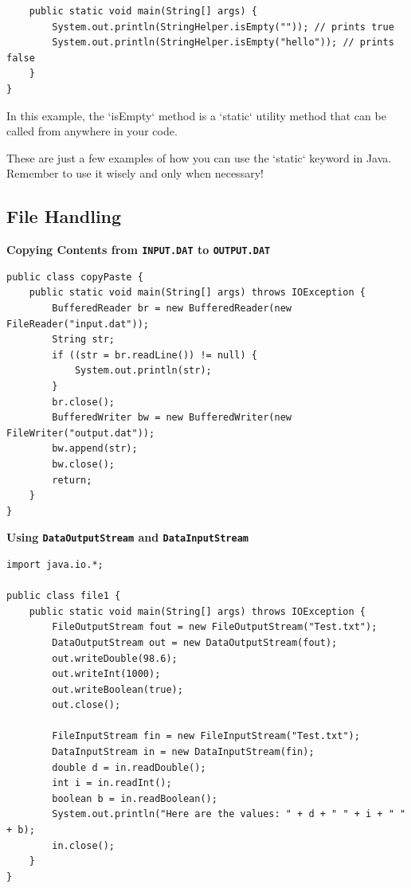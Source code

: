 \documentclass{book}
\begin{document}
\begin{enumerate}
\begin{verbatim}
    public static void main(String[] args) {
        System.out.println(StringHelper.isEmpty("")); // prints true
        System.out.println(StringHelper.isEmpty("hello")); // prints false
    }
}          
        \end{verbatim}
	      In this example, the `isEmpty` method is a `static` utility method that can be called from anywhere in your code.

	      These are just a few examples of how you can use the `static` keyword in Java. Remember to use it wisely and only when necessary!
\end{enumerate}
\subsection{File Handling}

\textbf{Copying Contents from \texttt{INPUT.DAT} to \texttt{OUTPUT.DAT}}

\begin{verbatim}
public class copyPaste {
    public static void main(String[] args) throws IOException {
        BufferedReader br = new BufferedReader(new FileReader("input.dat"));
        String str;
        if ((str = br.readLine()) != null) {
            System.out.println(str);
        }
        br.close();
        BufferedWriter bw = new BufferedWriter(new FileWriter("output.dat"));
        bw.append(str);
        bw.close();
        return;
    }
}
\end{verbatim}

\textbf{Using \texttt{DataOutputStream} and \texttt{DataInputStream}}

\begin{verbatim}
import java.io.*;

public class file1 {
    public static void main(String[] args) throws IOException {
        FileOutputStream fout = new FileOutputStream("Test.txt");
        DataOutputStream out = new DataOutputStream(fout);
        out.writeDouble(98.6);
        out.writeInt(1000);
        out.writeBoolean(true);
        out.close();
        
        FileInputStream fin = new FileInputStream("Test.txt");
        DataInputStream in = new DataInputStream(fin);
        double d = in.readDouble();
        int i = in.readInt();
        boolean b = in.readBoolean();
        System.out.println("Here are the values: " + d + " " + i + " " + b);
        in.close();
    }
}
\end{verbatim}
\end{document}
